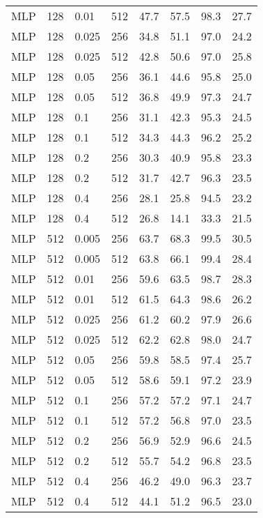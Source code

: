 \begin{table}[]
\begin{tabular}{llll rrrr}
        MLP & 128 & 0.01 & 512 & 47.7 & 57.5 & 98.3 & 27.7 \\
        MLP & 128 & 0.025 & 256 & 34.8 & 51.1 & 97.0 & 24.2 \\
        MLP & 128 & 0.025 & 512 & 42.8 & 50.6 & 97.0 & 25.8 \\
        MLP & 128 & 0.05 & 256 & 36.1 & 44.6 & 95.8 & 25.0 \\
        MLP & 128 & 0.05 & 512 & 36.8 & 49.9 & 97.3 & 24.7 \\
        MLP & 128 & 0.1 & 256 & 31.1 & 42.3 & 95.3 & 24.5 \\
        MLP & 128 & 0.1 & 512 & 34.3 & 44.3 & 96.2 & 25.2 \\
        MLP & 128 & 0.2 & 256 & 30.3 & 40.9 & 95.8 & 23.3 \\
        MLP & 128 & 0.2 & 512 & 31.7 & 42.7 & 96.3 & 23.5 \\
        MLP & 128 & 0.4 & 256 & 28.1 & 25.8 & 94.5 & 23.2 \\
        MLP & 128 & 0.4 & 512 & 26.8 & 14.1 & 33.3 & 21.5 \\
        MLP & 512 & 0.005 & 256 & 63.7 & 68.3 & 99.5 & 30.5 \\
        MLP & 512 & 0.005 & 512 & 63.8 & 66.1 & 99.4 & 28.4 \\
        MLP & 512 & 0.01 & 256 & 59.6 & 63.5 & 98.7 & 28.3 \\
        MLP & 512 & 0.01 & 512 & 61.5 & 64.3 & 98.6 & 26.2 \\
        MLP & 512 & 0.025 & 256 & 61.2 & 60.2 & 97.9 & 26.6 \\
        MLP & 512 & 0.025 & 512 & 62.2 & 62.8 & 98.0 & 24.7 \\
        MLP & 512 & 0.05 & 256 & 59.8 & 58.5 & 97.4 & 25.7 \\
        MLP & 512 & 0.05 & 512 & 58.6 & 59.1 & 97.2 & 23.9 \\
        MLP & 512 & 0.1 & 256 & 57.2 & 57.2 & 97.1 & 24.7 \\
        MLP & 512 & 0.1 & 512 & 57.2 & 56.8 & 97.0 & 23.5 \\
        MLP & 512 & 0.2 & 256 & 56.9 & 52.9 & 96.6 & 24.5 \\
        MLP & 512 & 0.2 & 512 & 55.7 & 54.2 & 96.8 & 23.5 \\
        MLP & 512 & 0.4 & 256 & 46.2 & 49.0 & 96.3 & 23.7 \\
        MLP & 512 & 0.4 & 512 & 44.1 & 51.2 & 96.5 & 23.0 \\
        \bottomrule
    \end{tabular}
\end{table}

